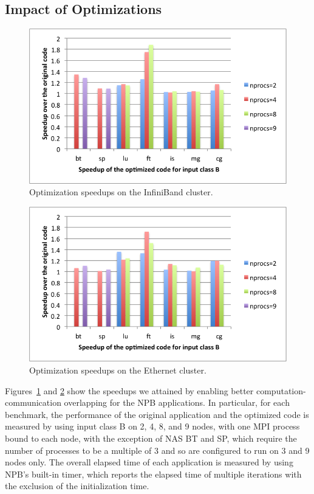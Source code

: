 \subsection{Impact of Optimizations}
\begin{figure}
{\scriptsize
\centering
\includegraphics[width=.48\textwidth]{fig/blues/npb_blues_B.png}
\caption{Optimization speedups on the InfiniBand cluster.}
\label{fig:npb:x86}
}%
\end{figure}
\begin{figure}
{\scriptsize
\centering
\includegraphics[width=.48\textwidth]{fig/disco/npb_disco_B.png}
\caption{Optimization speedups on the Ethernet cluster.}
\label{fig:npb:x64}
}
\end{figure}


Figures~\ref{fig:npb:x86} and \ref{fig:npb:x64}
show the speedups we attained by enabling better computation-communication overlapping for the NPB applications.
In particular, for each benchmark, the performance of the original application and the optimized code is measured by using input class B on 2, 4, 8, and 9 nodes,  with one MPI process bound to each node, 
with the exception of NAS BT and SP, which require the number of processes to be a multiple of 3 and so are configured to run on 3 and 9 nodes only.
The overall elapsed time of each application is measured by using NPB's built-in timer, which reports the elapsed time of multiple iterations with the exclusion of the initialization time.


